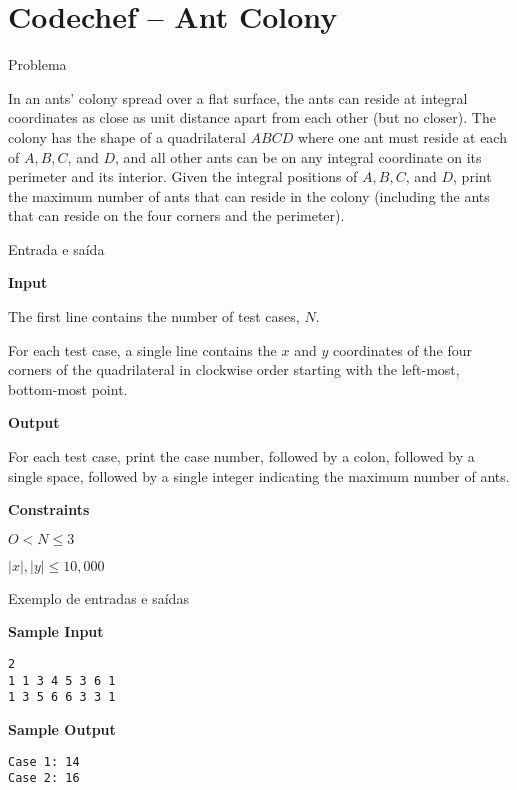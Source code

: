 \section{Codechef -- Ant Colony}

\begin{frame}[fragile]{Problema}

In an ants' colony spread over a flat surface, the ants can reside at integral coordinates as close 
as unit distance apart from each other (but no closer). The colony has the shape of a quadrilateral
$ABCD$ where one ant must reside at each of $A, B, C$, and $D$, and all other ants can be on any 
integral coordinate on its perimeter and its interior. Given the integral positions of $A, B, C$, 
and $D$, print the maximum number of ants that can reside in the colony (including the ants that 
can reside on the four corners and the perimeter).

\end{frame}

\begin{frame}[fragile]{Entrada e saída}

\textbf{Input}

The first line contains the number of test cases, $N$.

For each test case, a single line contains the $x$ and $y$ coordinates of the four corners of the 
quadrilateral in clockwise order starting with the left-most, bottom-most point.

\textbf{Output}

For each test case, print the case number, followed by a colon, followed by a single space, followed by a single integer indicating the maximum number of ants.

\textbf{Constraints}

$O < N \leq 3$

$|x|, |y| \leq 10,000$

\end{frame}

\begin{frame}[fragile]{Exemplo de entradas e saídas}

\begin{minipage}[t]{0.5\textwidth}
\textbf{Sample Input}
\begin{verbatim}
2
1 1 3 4 5 3 6 1
1 3 5 6 6 3 3 1
\end{verbatim}
\end{minipage}
\begin{minipage}[t]{0.45\textwidth}
\textbf{Sample Output}
\begin{verbatim}
Case 1: 14
Case 2: 16
\end{verbatim}
\end{minipage}
\end{frame}


